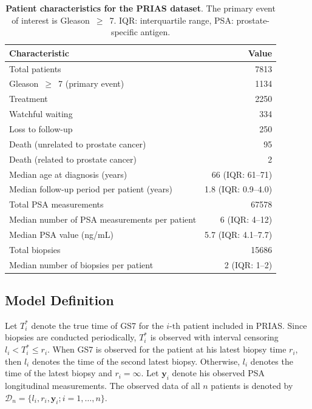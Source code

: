 \begin{table}[!htb]
\small\sf\centering
\caption{\textbf{Patient characteristics for the PRIAS dataset}. The primary event of interest is Gleason~$\geq$~7. IQR: interquartile range, PSA: prostate-specific antigen.}
\label{table:prias_summary}
\begin{tabular}{lr}
\hline
\hline
Characteristic & Value\\
\hline
Total patients & 7813\\
Gleason~$\geq$~7 (primary event) & 1134\\
Treatment & 2250\\
Watchful waiting & 334\\
Loss to follow-up & 250\\
Death (unrelated to prostate cancer) & 95\\
Death (related to prostate cancer) & 2\\
\hline
Median age at diagnosis (years) & 66 (IQR: 61--71)\\
Median follow-up period per patient (years) &  1.8 (IQR: 0.9--4.0)\\
Total PSA measurements & 67578\\
Median number of PSA measurements per patient &  6 (IQR: 4--12)\\
Median PSA value (ng/mL) & 5.7 (IQR: 4.1--7.7)\\
Total biopsies & 15686\\
Median number of biopsies per patient &  2 (IQR: 1--2)\\
\hline
\end{tabular}
\end{table}

\subsection{Model Definition}
\label{subsec:model_def}
Let $T_i^*$ denote the true time of GS7 for the ${i\mbox{-th}}$ patient included in PRIAS. Since biopsies are conducted periodically, $T_i^*$ is observed with interval censoring ${l_i < T_i^* \leq r_i}$. When GS7 is observed for the patient at his latest biopsy time $r_i$, then $l_i$ denotes the time of the second latest biopsy. Otherwise, $l_i$ denotes the time of the latest biopsy and ${r_i=\infty}$. Let $\boldsymbol{y}_{i}$ denote his observed PSA longitudinal measurements. The observed data of all $n$ patients is denoted by ${\mathcal{D}_n = \{l_i, r_i, \boldsymbol{y}_{i}; i = 1, \ldots, n\}}$.

